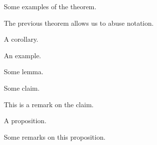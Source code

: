 \documentclass{beamer}
\begin{document}
\begin{frame}
    \begin{examples}
        Some examples of the theorem. \lipsum[5]
    \end{examples}
\end{frame}

\begin{frame}
    \begin{notation}
        The previous theorem allows us to abuse notation. \lipsum[6]
    \end{notation}
\end{frame}

\begin{frame}
    \begin{corollary}
        A corollary. \lipsum[7]
    \end{corollary}
\end{frame}

\begin{frame}
    \begin{example}[An example]
        An example. \lipsum[8]
    \end{example}
\end{frame}

\begin{frame}
    \begin{lemma}
        Some lemma. \lipsum[9]
    \end{lemma}
\end{frame}

\begin{frame}
    \begin{claim}
        Some claim. \lipsum[10]
    \end{claim}
\end{frame}

\begin{frame}
    \begin{remark}
        This is a remark on the claim. \lipsum[11]
    \end{remark}
\end{frame}

\begin{frame}
    \begin{proposition}
        A proposition. \lipsum[12]
    \end{proposition}
\end{frame}

\begin{frame}
    \begin{remarks}
        Some remarks on this proposition. \lipsum[13]
    \end{remarks}
\end{frame}
\end{document}
